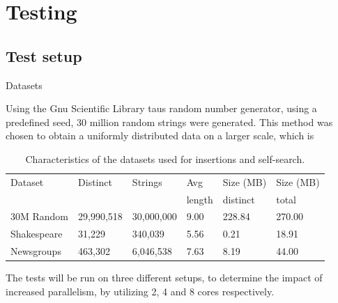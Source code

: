 \chapter{Testing}

\section{Test setup}
Datasets

Using the Gnu Scientific Library taus random number generator, using a predefined seed,
30 million random strings were generated. This method was chosen to obtain a uniformly distributed
data on a larger scale, which is 
\begin{table}[h!]
    \centering
    \begin{tabular}[here]{l l l l l l}
        \hline
        Dataset    & Distinct   & Strings      & Avg     & Size (MB)& Size (MB)\\
                   &            &              & length  & distinct & total    \\\hline
        30M Random & 29,990,518 & 30,000,000   & 9.00    & 228.84   & 270.00\\
        Shakespeare&  31,229    & 340,039      & 5.56    & 0.21     & 18.91\\
        Newsgroups & 463,302    & 6,046,538    & 7.63    & 8.19     & 44.00\\
        \hline
    \end{tabular}
    \caption{Characteristics of the datasets used for insertions and self-search.}
    \label{tab:datasets}
\end{table}


The tests will be run on three different setups, to determine the impact of
increased parallelism, by utilizing 2, 4 and 8 cores respectively.

